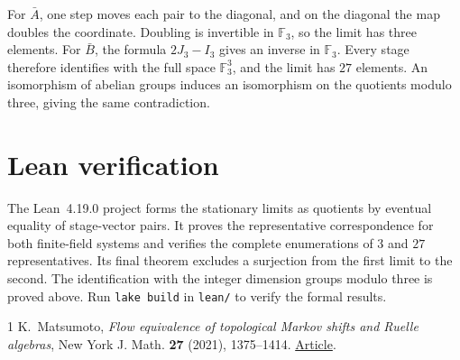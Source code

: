 \documentclass[11pt]{article}
\begin{document}
For \(\bar A\), one step moves each pair to the diagonal, and
on the diagonal the map doubles the coordinate. Doubling is
invertible in \(\mathbb F_3\), so the limit has three elements.
For \(\bar B\), the formula \(2J_3-I_3\) gives an inverse in
\(\mathbb F_3\). Every stage therefore identifies with the full
space \(\mathbb F_3^3\), and the limit has \(27\) elements.
An isomorphism of abelian groups induces an isomorphism on the
quotients modulo three, giving the same contradiction.

\section*{Lean verification}

The Lean~4.19.0 project forms the stationary limits as quotients
by eventual equality of stage-vector pairs. It proves the
representative correspondence for both finite-field systems
and verifies the complete enumerations of \(3\) and \(27\)
representatives. Its final theorem excludes a surjection from
the first limit to the second. The identification with the
integer dimension groups modulo three is proved above. Run
\verb|lake build| in \verb|lean/| to verify the formal results.

\begin{thebibliography}{1}
K.~Matsumoto, \emph{Flow equivalence of topological Markov shifts and
Ruelle algebras}, New York J. Math. \textbf{27} (2021), 1375--1414.
\href{https://nyjm.albany.edu/j/2021/27-53v.pdf}{Article}.
\end{thebibliography}
\end{document}
